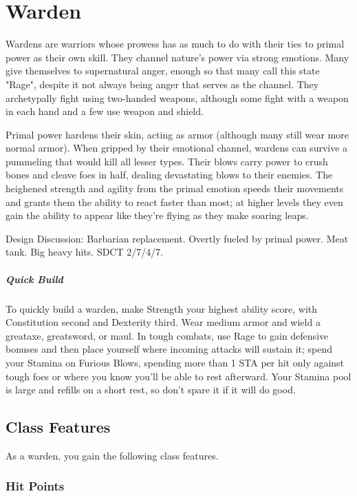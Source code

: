 \section{Warden\label{class:warden}}

Wardens are warriors whose prowess has as much to do with their ties to primal power as their own skill. They channel nature's power via strong emotions. Many give themselves to supernatural anger, enough so that many call this state "Rage", despite it not always being anger that serves as the channel. They archetypally fight using two-handed weapons, although some fight with a weapon in each hand and a few use weapon and shield.

Primal power hardens their skin, acting as armor (although many still wear more normal armor). When gripped by their emotional channel, wardens can survive a pummeling that would kill all lesser types. Their blows carry power to crush bones and cleave foes in half, dealing devastating blows to their enemies. The heighened strength and agility from the primal emotion speeds their movements and grants them the ability to react faster than most; at higher levels they even gain the ability to appear like they're flying as they make soaring leaps.

Design Discussion: Barbarian replacement. Overtly fueled by primal power. Meat tank. Big heavy hits. SDCT 2/7/4/7.

\subparagraph*{Quick Build}
To quickly build a warden, make Strength your highest ability score, with Constitution second and Dexterity third. Wear medium armor and wield a greataxe, greatsword, or maul. In tough combats, use Rage to gain defensive bonuses and then place yourself where incoming attacks will sustain it; spend your Stamina on Furious Blows, spending more than 1 STA per hit only against tough foes or where you know you'll be able to rest afterward. Your Stamina pool is large and refills on a short rest, so don't spare it if it will do good.

\subsection{Class Features}

As a warden, you gain the following class features.

\subsubsection{Hit Points}

